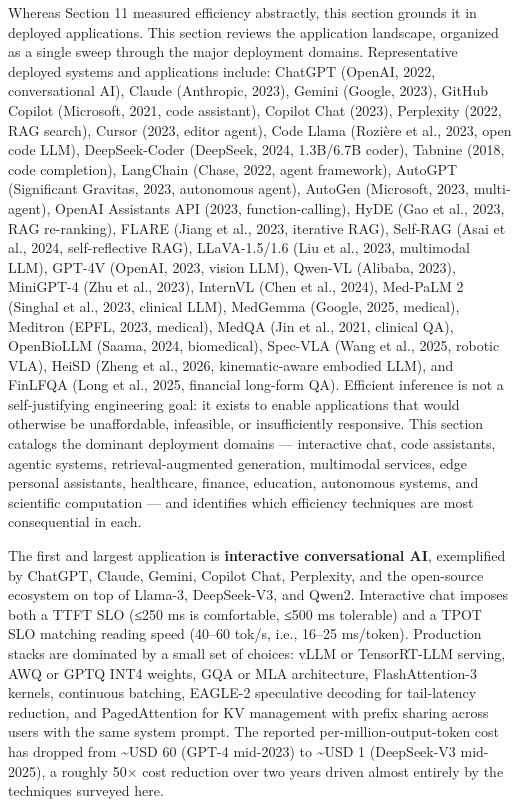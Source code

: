Whereas Section 11 measured efficiency abstractly, this section grounds it in deployed applications. This section reviews the application landscape, organized as a single sweep through the major deployment domains. Representative deployed systems and applications include: ChatGPT (OpenAI, 2022, conversational AI), Claude (Anthropic, 2023), Gemini (Google, 2023), GitHub Copilot (Microsoft, 2021, code assistant), Copilot Chat (2023), Perplexity (2022, RAG search), Cursor (2023, editor agent), Code Llama (Rozière et al., 2023, open code LLM), DeepSeek-Coder (DeepSeek, 2024, 1.3B/6.7B coder), Tabnine (2018, code completion), LangChain (Chase, 2022, agent framework), AutoGPT (Significant Gravitas, 2023, autonomous agent), AutoGen (Microsoft, 2023, multi-agent), OpenAI Assistants API (2023, function-calling), HyDE (Gao et al., 2023, RAG re-ranking), FLARE (Jiang et al., 2023, iterative RAG), Self-RAG (Asai et al., 2024, self-reflective RAG), LLaVA-1.5/1.6 (Liu et al., 2023, multimodal LLM), GPT-4V (OpenAI, 2023, vision LLM), Qwen-VL (Alibaba, 2023), MiniGPT-4 (Zhu et al., 2023), InternVL (Chen et al., 2024), Med-PaLM 2 (Singhal et al., 2023, clinical LLM), MedGemma (Google, 2025, medical), Meditron (EPFL, 2023, medical), MedQA (Jin et al., 2021, clinical QA), OpenBioLLM (Saama, 2024, biomedical), Spec-VLA (Wang et al., 2025, robotic VLA), HeiSD (Zheng et al., 2026, kinematic-aware embodied LLM), and FinLFQA (Long et al., 2025, financial long-form QA). Efficient inference is not a self-justifying engineering goal: it exists to enable applications that would otherwise be unaffordable, infeasible, or insufficiently responsive. This section catalogs the dominant deployment domains --- interactive chat, code assistants, agentic systems, retrieval-augmented generation, multimodal services, edge personal assistants, healthcare, finance, education, autonomous systems, and scientific computation --- and identifies which efficiency techniques are most consequential in each.

The first and largest application is \textbf{interactive conversational AI}, exemplified by ChatGPT, Claude, Gemini, Copilot Chat, Perplexity, and the open-source ecosystem on top of Llama-3, DeepSeek-V3, and Qwen2. Interactive chat imposes both a TTFT SLO (≤250 ms is comfortable, ≤500 ms tolerable) and a TPOT SLO matching reading speed (40--60 tok/s, i.e., 16--25 ms/token). Production stacks are dominated by a small set of choices: vLLM or TensorRT-LLM serving, AWQ or GPTQ INT4 weights, GQA or MLA architecture, FlashAttention-3 kernels, continuous batching, EAGLE-2 speculative decoding for tail-latency reduction, and PagedAttention for KV management with prefix sharing across users with the same system prompt. The reported per-million-output-token cost has dropped from \textasciitilde USD 60 (GPT-4 mid-2023) to \textasciitilde USD 1 (DeepSeek-V3 mid-2025), a roughly 50× cost reduction over two years driven almost entirely by the techniques surveyed here.

